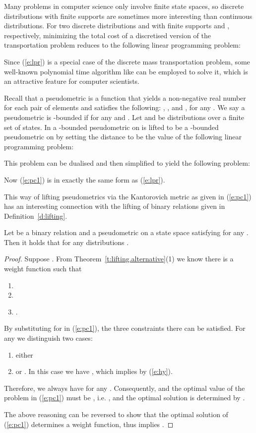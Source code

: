 \documentclass{article}
\begin{document}
Many problems in computer science only involve finite state spaces,
so discrete distributions with finite supports are sometimes more
interesting than continuous distributions. For two discrete
distributions  and  with finite supports
 and , respectively, minimizing
the total cost of a discretised version of the transportation
problem reduces to the following linear programming problem:


Since (\ref{e:lpr}) is a special case of the discrete mass
transportation problem, some well-known polynomial time algorithm
like \cite{Orl88} can be employed to solve it, which is an
attractive feature for computer scientists.

\bigskip
Recall that a pseudometric
  is a function that yields a non-negative real number for each pair
  of elements and satisfies the following: ,
  , and , for any . We say a
  pseudometric  is -bounded if  for any  and
  .
Let  and  be distributions over a finite set  of
states. In \cite{BW01} a -bounded pseudometric  on  is
lifted to be a -bounded pseudometric  on  by
setting the distance  to be the value of the
following linear programming problem:

This problem can be dualised and then simplified to yield the
following problem:

Now (\ref{e:pc1}) is in exactly the same form as (\ref{e:lpr}).

This way of lifting pseudometrics via the Kantorovich metric as
given in (\ref{e:pc1}) has an interesting connection with the
lifting of binary relations given in Definition~\ref{d:lifting}.

\begin{theorem}\label{t:metric.relation}
Let  be a binary relation and  a pseudometric on a state space
 satisfying  for any .
Then it holds that  for any distributions
.
\end{theorem}
\begin{proof}
Suppose . From
Theorem~\ref{t:lifting.alternative}(1) we know there is a weight
function  such that
  \begin{enumerate}
  \item 
  \item 
  \item .
  \end{enumerate}
By substituting  for  in (\ref{e:pc1}), the three
constraints there can be satisfied. For any  we
distinguish two cases:
\begin{enumerate}
\item either 
\item or . In this case we have , which implies
 by (\ref{e:hy}).
\end{enumerate}
Therefore, we always have  for any .
Consequently,  and the optimal value
of the problem in (\ref{e:pc1}) must be , i.e.
, and the optimal solution is determined
by .

The above reasoning can be reversed to show that the optimal
solution of (\ref{e:pc1}) determines a weight function, thus
 implies .
\end{proof}
\end{document}
